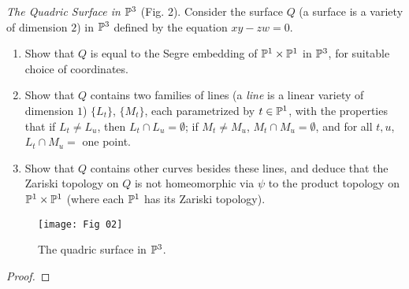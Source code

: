 \label{1.2.15}

\textit{The Quadric Surface in $\P^3$} (Fig. 2). Consider the surface $Q$ (a surface is a variety of dimension $2$) in $\P^3$ defined by the equation $xy - zw = 0$.

\begin{enumerate}[label = (\alph*)]
    \item Show that $Q$ is equal to the Segre embedding of $\P^1 \times \P^1$ in $\P^3$, for suitable choice of coordinates.
    
    \item Show that $Q$ contains two families of lines (a \textit{line} is a linear variety of dimension $1$) $\{L_t\}$, $\{M_t\}$, each parametrized by $t \in \P^1$, with the properties that if $L_t \neq L_u$, then $L_t \cap L_u = \emptyset$; if $M_t \neq M_u$, $M_t \cap M_u = \emptyset$, and for all $t, u$, $L_t \cap M_u = $ one point.
    
    \item Show that $Q$ contains other curves besides these lines, and deduce that the Zariski topology on $Q$ is not homeomorphic via $\psi$ to the product topology on $\P^1 \times \P^1$ (where each $\P^1$ has its Zariski topology).
\end{enumerate}

\begin{figure}
    \centering
    \texttt{[image: Fig 02]}
    \caption{The quadric surface in $\P^3$.}
\end{figure}

\begin{proof}
    
\end{proof}
